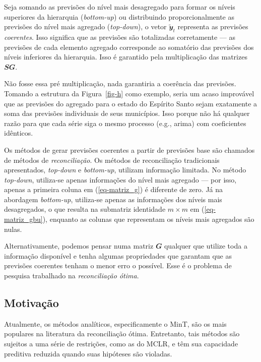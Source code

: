 \documentclass[
  12pt,
  oneside,
  a4paper,
  chapter=TITLE,
  section=TITLE,
  brazil]{abntex2}
\begin{document}
  Seja somando as previsões do
nível mais desagregado para formar os níveis superiores da hierarquia
(\emph{bottom-up}) ou distribuindo proporcionalmente as previsões do
nível mais agregado (\emph{top-down}), o vetor
\(\mathbfit{\tilde{y}}_t\) representa as previsões \emph{coerentes}.
Isso significa que as previsões são totalizadas corretamente --- as
previsões de cada elemento agregado corresponde ao somatório das
previsões dos níveis inferiores da hierarquia. Isso é garantido pela
multiplicação das matrizes \(\mathbfit{SG}\).

Não fosse essa pré multiplicação, nada garantiria a coerência das
previsões. Tomando a estrutura da Figura~\ref{fig-h} como exemplo, seria
um acaso improvável que as previsões do agregado para o estado do
Espírito Santo sejam exatamente a soma das previsões individuais de seus
municípios. Isso porque não há qualquer razão para que cada série siga o
mesmo processo (e.g., arima) com coeficientes idênticos.

Os métodos de gerar previsões coerentes a partir de previsões base são
chamados de métodos de \emph{reconciliação}. Os métodos de reconciliação
tradicionais apresentados, \emph{top-down} e \emph{bottom-up}, utilizam
informação limitada. No método \emph{top-down}, utiliza-se apenas
informações do nível mais agregado --- por isso, apenas a primeira
coluna em (\ref{eq-matriz_g}) é diferente de zero. Já na abordagem
\emph{bottom-up}, utiliza-se apenas as informações dos níveis mais
desagregados, o que resulta na submatriz identidade \(m \times m\) em
(\ref{eq-matriz_gbu}), enquanto as colunas que representam os níveis
mais agregados são nulas.

Alternativamente, podemos pensar numa matriz \(\mathbfit{G}\) qualquer
que utilize toda a informação disponível e tenha algumas propriedades
que garantam que as previsões coerentes tenham o menor erro o possível.
Esse é o problema de pesquisa trabalhado na \emph{reconciliação ótima}.

\hypertarget{motivauxe7uxe3o}{%
\subsection{Motivação}\label{motivauxe7uxe3o}}

Atualmente, os métodos analíticos, especificamente o MinT, são os mais
populares na literatura da reconciliação ótima. Entretanto, tais métodos
são sujeitos a uma série de restrições, como as do MCLR, e têm sua
capacidade preditiva reduzida quando suas hipóteses são violadas.
\end{document}
